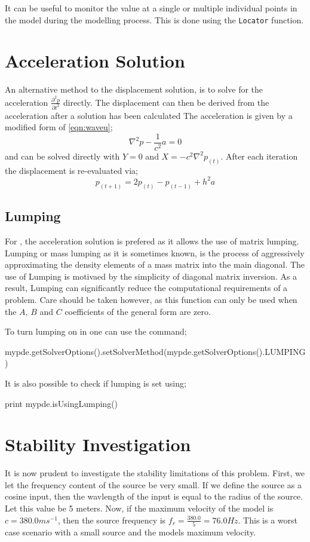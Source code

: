 It can be useful to monitor the value at a single or multiple individual points
in the model during the modelling process. This is done using 
the \verb!Locator! function.


\section{Acceleration Solution}

An alternative method to the displacement solution, is to solve for the
acceleration $\frac{\partial ^2 p}{\partial t^2}$ directly. The displacement can
then be derived from the acceleration after a solution has been calculated
The acceleration is given by a modified form of \autoref{eqn:waveu};
\begin{equation}
  \nabla ^2 p - \frac{1}{c^2} a = 0
\label{eqn:wavea}
\end{equation}
and can be solved directly with $Y=0$ and $X=-c^2 \nabla ^2 p_{(t)}$.
After each iteration the displacement is re-evaluated via;
\begin{equation}
 p_{(t+1)}=2p_{(t)} - p_{(t-1)} + h^2a
\end{equation}

\subsection{Lumping}
For \esc, the acceleration solution is prefered as it allows the use of matrix
lumping. Lumping or mass lumping as it is sometimes known, is the process of
aggressively approximating the density elements of a mass matrix into the main
diagonal. The use of Lumping is motivaed by the simplicity of diagonal matrix
 inversion. As a result, Lumping can significantly reduce the computational
requirements of a problem. Care should be taken however, as this
function can only be used when the $A$, $B$ and $C$ coefficients of the
general form are zero. 

To turn lumping on in \esc one can use the command;
\begin{python}
 mypde.getSolverOptions().setSolverMethod(mypde.getSolverOptions().LUMPING)
\end{python}
It is also possible to check if lumping is set using;
\begin{python}
  print mypde.isUsingLumping()
\end{python}

\section{Stability Investigation}
It is now prudent to investigate the stability limitations of this problem.
First, we let the frequency content of the source be very small. If we define
the source as a cosine input, then the wavlength of the input is equal to the
radius of the source. Let this value be 5 meters. Now, if the maximum velocity
of the model is $c=380.0ms^{-1}$, then the source
frequency is $f_{r} = \frac{380.0}{5} = 76.0 Hz$. This is a worst case
scenario with a small source and the models maximum velocity. 

